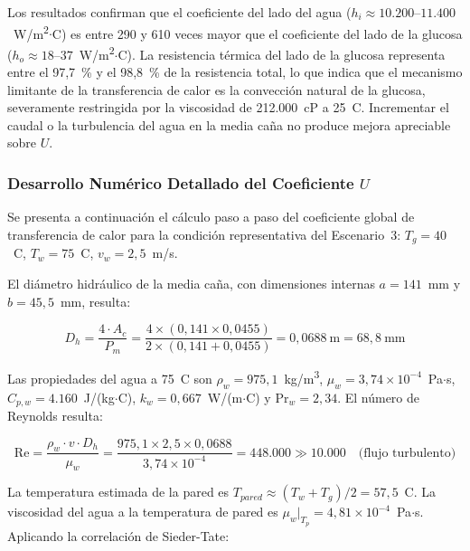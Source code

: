 Los resultados confirman que el coeficiente del lado del agua ($h_i \approx 10{.}200$--$11{.}400$~W/m\textsuperscript{2}$\cdot$\textdegree C) es entre 290 y 610 veces mayor que el coeficiente del lado de la glucosa ($h_o \approx 18$--$37$~W/m\textsuperscript{2}$\cdot$\textdegree C). La resistencia t\'ermica del lado de la glucosa representa entre el 97,7~\% y el 98,8~\% de la resistencia total, lo que indica que el mecanismo limitante de la transferencia de calor es la convecci\'on natural de la glucosa, severamente restringida por la viscosidad de 212{.}000~cP a 25~\textdegree C. Incrementar el caudal o la turbulencia del agua en la media ca\~na no produce mejora apreciable sobre $U$.

\subsubsection{Desarrollo Num\'erico Detallado del Coeficiente $U$}

Se presenta a continuaci\'on el c\'alculo paso a paso del coeficiente global de transferencia de calor para la condici\'on representativa del Escenario~3: $T_g = 40$~\textdegree C, $T_w = 75$~\textdegree C, $v_w = 2,5$~m/s.

El di\'ametro hidr\'aulico de la media ca\~na, con dimensiones internas $a = 141$~mm y $b = 45,5$~mm, resulta:

\begin{equation}
D_h = \frac{4 \cdot A_c}{P_m} = \frac{4 \times (0,141 \times 0,0455)}{2 \times (0,141 + 0,0455)} = 0,0688~\text{m} = 68,8~\text{mm}
\end{equation}

Las propiedades del agua a 75~\textdegree C son $\rho_w = 975,1$~kg/m\textsuperscript{3}, $\mu_w = 3,74 \times 10^{-4}$~Pa$\cdot$s, $C_{p,w} = 4{.}160$~J/(kg$\cdot$\textdegree C), $k_w = 0,667$~W/(m$\cdot$\textdegree C) y $\text{Pr}_w = 2,34$. El n\'umero de Reynolds resulta:

\begin{equation}
\text{Re} = \frac{\rho_w \cdot v \cdot D_h}{\mu_w} = \frac{975,1 \times 2,5 \times 0,0688}{3,74 \times 10^{-4}} = 448{.}000 \gg 10{.}000 \quad \text{(flujo turbulento)}
\end{equation}

La temperatura estimada de la pared es $T_{pared} \approx (T_w + T_g)/2 = 57,5$~\textdegree C. La viscosidad del agua a la temperatura de pared es $\mu_w|_{T_p} = 4,81 \times 10^{-4}$~Pa$\cdot$s. Aplicando la correlaci\'on de Sieder-Tate:

